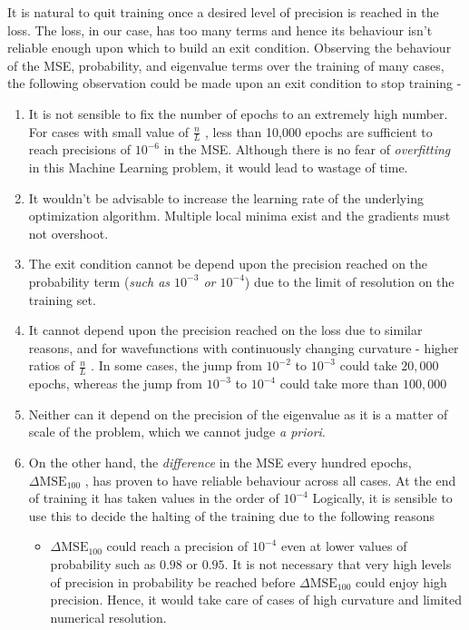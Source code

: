 \documentclass{article}
\newcommand{\nLratio}{$\displaystyle{\frac{n}{L}}$ }
\newcommand{\dmse}{$\displaystyle{\Delta \text{MSE}_{100}}$ }
\newcommand{\oom}[1]{$10^{#1}$}
\begin{document}
\justify
It is natural to quit training once a desired level of precision is reached in the loss. The loss, in our case, has too many terms and hence its behaviour isn't reliable enough upon which to build an exit condition. Observing the behaviour of the MSE, probability, and eigenvalue terms over the training of many cases, the following observation could be made upon an exit condition to stop training -
\begin{enumerate}
    \item It is not sensible to fix the number of epochs to an extremely high number. For cases with small value of \nLratio, less than 10,000 epochs are sufficient to reach precisions of \oom{-6} in the MSE. Although there is no fear of \textit{overfitting} in this Machine Learning problem, it would lead to wastage of time.
    \item It wouldn't be advisable to increase the learning rate of the underlying optimization algorithm. Multiple local minima exist and the gradients must not overshoot.
    \item The exit condition cannot be depend upon the precision reached on the probability term (\textit{such as \oom{-3} or \oom{-4}}) due to the limit of resolution on the training set.
    \item It cannot depend upon the precision reached on the loss due to similar reasons, and for wavefunctions with continuously changing curvature - higher ratios of \nLratio. In some cases, the jump from \oom{-2} to \oom{-3} could take $20,000$ epochs, whereas the jump from \oom{-3} to \oom{-4} could take more than $100,000$
    \item Neither can it depend on the precision of the eigenvalue as it is a matter of scale of the problem, which we cannot judge \textit{a priori}.
    \item On the other hand, the \textit{difference} in the MSE every hundred epochs, \dmse, has proven to have reliable behaviour across all cases. At the end of training it has taken values in the order of $10^{-4}$ Logically, it is sensible to use this to decide the halting of the training due to the following reasons
    \begin{itemize}
        \item \dmse could reach a precision of \oom{-4} even at lower values of probability such as $0.98$ or $0.95$. It is not necessary that very high levels of precision in probability be reached before \dmse could enjoy high precision. Hence, it would take care of cases of high curvature and limited numerical resolution.

\end{itemize}
\end{enumerate}
\end{document}
